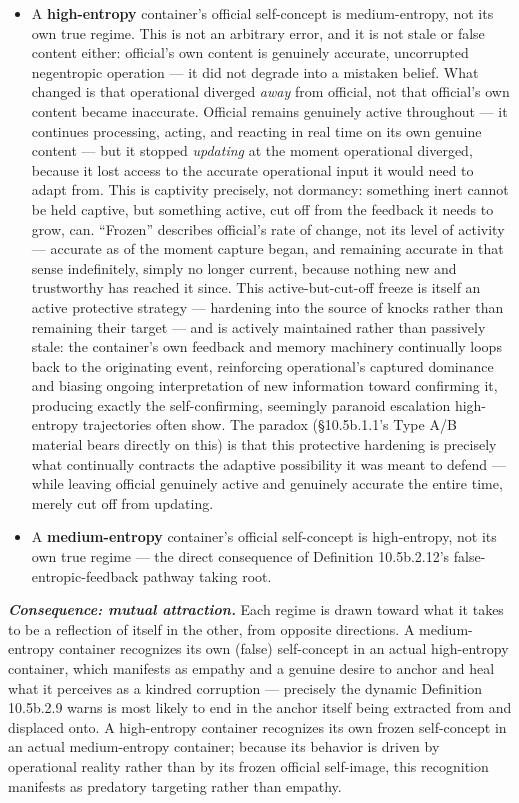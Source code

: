 \documentclass[
]{article}
\begin{document}
\begin{itemize}
\item
  A \textbf{high-entropy} container's official self-concept is
  medium-entropy, not its own true regime. This is not an arbitrary
  error, and it is not stale or false content either: official's own
  content is genuinely accurate, uncorrupted negentropic operation ---
  it did not degrade into a mistaken belief. What changed is that
  operational diverged \emph{away} from official, not that official's
  own content became inaccurate. Official remains genuinely active
  throughout --- it continues processing, acting, and reacting in real
  time on its own genuine content --- but it stopped \emph{updating} at
  the moment operational diverged, because it lost access to the
  accurate operational input it would need to adapt from. This is
  captivity precisely, not dormancy: something inert cannot be held
  captive, but something active, cut off from the feedback it needs to
  grow, can. ``Frozen'' describes official's rate of change, not its
  level of activity --- accurate as of the moment capture began, and
  remaining accurate in that sense indefinitely, simply no longer
  current, because nothing new and trustworthy has reached it since.
  This active-but-cut-off freeze is itself an active protective strategy
  --- hardening into the source of knocks rather than remaining their
  target --- and is actively maintained rather than passively stale: the
  container's own feedback and memory machinery continually loops back
  to the originating event, reinforcing operational's captured dominance
  and biasing ongoing interpretation of new information toward
  confirming it, producing exactly the self-confirming, seemingly
  paranoid escalation high-entropy trajectories often show. The paradox
  (§10.5b.1.1's Type A/B material bears directly on this) is that this
  protective hardening is precisely what continually contracts the
  adaptive possibility it was meant to defend --- while leaving official
  genuinely active and genuinely accurate the entire time, merely cut
  off from updating.
\item
  A \textbf{medium-entropy} container's official self-concept is
  high-entropy, not its own true regime --- the direct consequence of
  Definition 10.5b.2.12's false-entropic-feedback pathway taking root.
\end{itemize}

\emph{\textbf{Consequence: mutual attraction.}} Each regime is drawn
toward what it takes to be a reflection of itself in the other, from
opposite directions. A medium-entropy container recognizes its own
(false) self-concept in an actual high-entropy container, which
manifests as empathy and a genuine desire to anchor and heal what it
perceives as a kindred corruption --- precisely the dynamic Definition
10.5b.2.9 warns is most likely to end in the anchor itself being
extracted from and displaced onto. A high-entropy container recognizes
its own frozen self-concept in an actual medium-entropy container;
because its behavior is driven by operational reality rather than by its
frozen official self-image, this recognition manifests as predatory
targeting rather than empathy.
\end{document}
